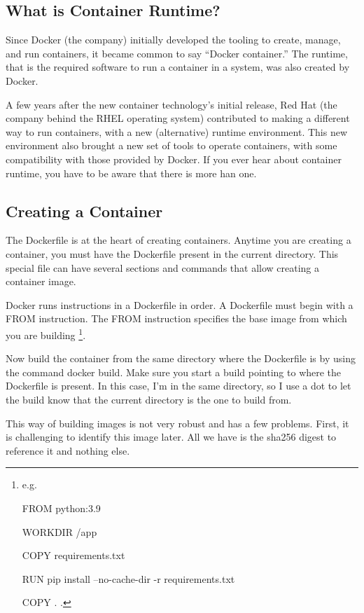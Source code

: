 \subsection*{What is Container Runtime?}
Since Docker (the company) initially developed the tooling to
create, manage, and run containers, it became common to say
“Docker container.” The runtime, that is the required software
to run a container  in a system, was also created by Docker.

A few years after the new container technology's initial release,
Red Hat (the company behind the RHEL operating system)
contributed to making a different way to run containers, with a
new (alternative) runtime environment. This new environment
also brought a new set of tools to operate containers, with some
compatibility with those provided by Docker. If you ever hear
about container runtime, you have to be aware that there is more 
han one.




\subsection*{Creating a Container}
The Dockerfile is at the heart of creating containers.
Anytime you are creating a container, you must have the
Dockerfile present in the current directory. This special
file can have several sections and commands that allow
creating a container image.

Docker runs instructions in a Dockerfile in order.
A Dockerfile must begin with a FROM instruction. 
The FROM instruction specifies the base image from which
you are building 
\footnote{
    e.g. 

    FROM python:3.9

    WORKDIR /app

    COPY requirements.txt

    RUN pip install --no-cache-dir -r requirements.txt

    COPY . .
}.

Now build the container from the same directory where
the Dockerfile is by using the command docker build.
Make sure you start a build pointing to where the
Dockerfile is present. In this case, I'm in the same
directory, so I use a dot to let the build know that
the current directory is the one to build from.

This way of building images is not very robust and has a
few problems. First, it is challenging to identify this
image later. All we have is the sha256 digest to reference
it and nothing else.

